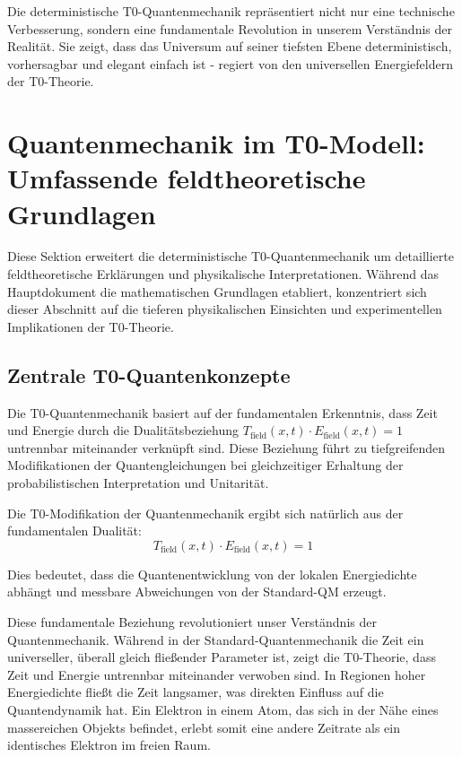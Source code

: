 \documentclass[12pt,a4paper]{article}
\theoremstyle{definition}
\theoremstyle{remark}
\begin{document}
Die deterministische T0-Quantenmechanik repr{\"a}sentiert nicht nur eine technische Verbesserung, sondern eine fundamentale Revolution in unserem Verst{\"a}ndnis der Realit{\"a}t. Sie zeigt, dass das Universum auf seiner tiefsten Ebene deterministisch, vorhersagbar und elegant einfach ist - regiert von den universellen Energiefeldern der T0-Theorie.
\section{Quantenmechanik im T0-Modell: Umfassende feldtheoretische Grundlagen}

Diese Sektion erweitert die deterministische T0-Quantenmechanik um detaillierte feldtheoretische Erklärungen und physikalische Interpretationen. Während das Hauptdokument die mathematischen Grundlagen etabliert, konzentriert sich dieser Abschnitt auf die tieferen physikalischen Einsichten und experimentellen Implikationen der T0-Theorie.

\subsection{Zentrale T0-Quantenkonzepte}

Die T0-Quantenmechanik basiert auf der fundamentalen Erkenntnis, dass Zeit und Energie durch die Dualitätsbeziehung $T_{\text{field}}(x,t) \cdot E_{\text{field}}(x,t) = 1$ untrennbar miteinander verknüpft sind. Diese Beziehung führt zu tiefgreifenden Modifikationen der Quantengleichungen bei gleichzeitiger Erhaltung der probabilistischen Interpretation und Unitarität.

\begin{tcolorbox}[colback=blue!5!white,colframe=blue!75!black,title=Zentrale Erkenntnis]
	Die T0-Modifikation der Quantenmechanik ergibt sich natürlich aus der fundamentalen Dualität:
	$$T_{\text{field}}(x,t) \cdot E_{\text{field}}(x,t) = 1$$
	
	Dies bedeutet, dass die Quantenentwicklung von der lokalen Energiedichte abhängt und messbare Abweichungen von der Standard-QM erzeugt.
\end{tcolorbox}

Diese fundamentale Beziehung revolutioniert unser Verständnis der Quantenmechanik. Während in der Standard-Quantenmechanik die Zeit ein universeller, überall gleich fließender Parameter ist, zeigt die T0-Theorie, dass Zeit und Energie untrennbar miteinander verwoben sind. In Regionen hoher Energiedichte fließt die Zeit langsamer, was direkten Einfluss auf die Quantendynamik hat. Ein Elektron in einem Atom, das sich in der Nähe eines massereichen Objekts befindet, erlebt somit eine andere Zeitrate als ein identisches Elektron im freien Raum.
\end{document}
